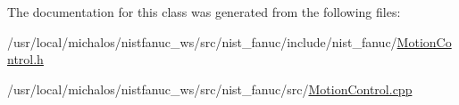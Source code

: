 The documentation for this class was generated from the following files\-:\begin{DoxyCompactItemize}
\item 
/usr/local/michalos/nistfanuc\-\_\-ws/src/nist\-\_\-fanuc/include/nist\-\_\-fanuc/\hyperlink{MotionControl_8h}{Motion\-Control.\-h}\item 
/usr/local/michalos/nistfanuc\-\_\-ws/src/nist\-\_\-fanuc/src/\hyperlink{MotionControl_8cpp}{Motion\-Control.\-cpp}\end{DoxyCompactItemize}
